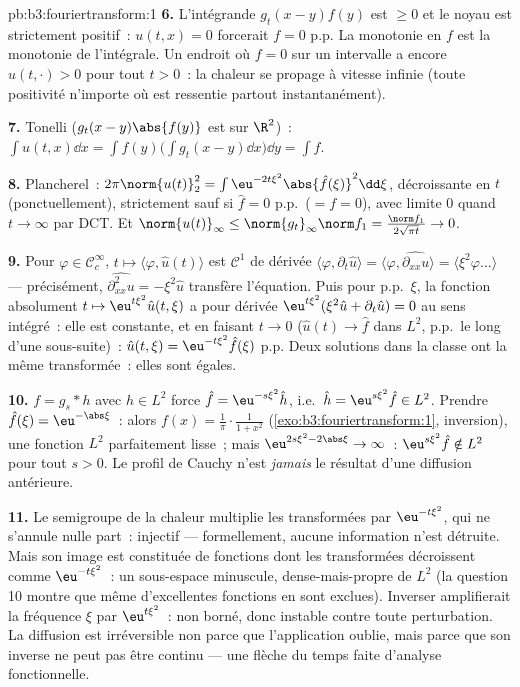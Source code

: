 \begin{solution}{pb:b3:fouriertransform:1}
\textbf{6.} L'intégrande $g_t(x-y)f(y)$ est $\geq 0$ et le
noyau est strictement positif~: $u(t,x) = 0$ forcerait $f =
0$ p.p. La monotonie en $f$ est la monotonie de l'intégrale.
Un endroit où $f = 0$ sur un intervalle a encore $u(t, \cdot)
> 0$ pour tout $t > 0$~: la chaleur se propage à vitesse
infinie (toute positivité n'importe où est ressentie partout
instantanément).

\textbf{7.} Tonelli ($g_t(x-y)\abs{f(y)}$ est  sur
$\R^2$)~: $\int u(t,x)\dd x = \int f(y)\bigl(\int g_t(x -
y)\dd x\bigr)\dd y = \int f$.

\textbf{8.} Plancherel~: $2\pi\norm{u(t)}_2^2 =
\int\eu^{-2t\xi^2}\abs{\hat f(\xi)}^2\dd\xi$, décroissante en
$t$ (ponctuellement), strictement sauf si $\hat f = 0$ p.p.\
($= f = 0$), avec limite $0$ quand $t\to\infty$ par DCT. Et
$\norm{u(t)}_\infty \leq \norm{g_t}_\infty\norm f_1 =
\frac{\norm f_1}{2\sqrt{\pi t}} \to 0$.

\textbf{9.} Pour $\varphi \in \mathcal C_c^\infty$, $t \mapsto
\langle\varphi, \hat u(t)\rangle$ est $\mathcal C^1$ de
dérivée $\langle\varphi, \partial_t\hat u\rangle =
\langle\varphi, \widehat{\partial_{xx}u}\rangle =
\langle\xi^2\varphi\dots\rangle$ --- précisément,
$\widehat{\partial^2_{xx}u} = -\xi^2\hat u$ transfère
l'équation. Puis pour p.p.\ $\xi$, la fonction absolument
 $t \mapsto \eu^{t\xi^2}\hat u(t,\xi)$ a pour
dérivée $\eu^{t\xi^2}(\xi^2\hat u + \partial_t\hat u) = 0$
au sens intégré~: elle est constante, et en faisant $t \to 0$
($\hat u(t) \to \hat f$ dans $L^2$, p.p.\ le long d'une
sous-suite)~: $\hat u(t, \xi) = \eu^{-t\xi^2}\hat f(\xi)$
p.p. Deux solutions dans la classe ont la même transformée~:
elles sont égales.

\textbf{10.} $f = g_s * h$ avec $h \in L^2$ force $\hat f =
\eu^{-s\xi^2}\hat h$, i.e.\ $\hat h = \eu^{s\xi^2}\hat f \in
L^2$. Prendre $\hat f(\xi) = \eu^{-\abs\xi}$~: alors $f(x) =
\frac1\pi\cdot\frac1{1 + x^2}$
(\cref{exo:b3:fouriertransform:1}, inversion), une fonction
$L^2$ parfaitement lisse~; mais $\eu^{2s\xi^2 - 2\abs\xi}
\to \infty$~: $\eu^{s\xi^2}\hat f \notin L^2$ pour tout $s >
0$. Le profil de Cauchy n'est \emph{jamais} le résultat d'une
diffusion antérieure.

\textbf{11.} Le semigroupe de la chaleur multiplie les
transformées par $\eu^{-t\xi^2}$, qui ne s'annule nulle
part~: injectif --- formellement, aucune information n'est
détruite. Mais son image est constituée de fonctions dont les
transformées décroissent comme $\eu^{-t\xi^2}$~: un
sous-espace minuscule, dense-mais-propre de $L^2$ (la
question 10 montre que même d'excellentes fonctions en sont
exclues). Inverser amplifierait la fréquence $\xi$ par
$\eu^{t\xi^2}$~: non borné, donc instable contre toute
perturbation. La diffusion est irréversible non parce que
l'application oublie, mais parce que son inverse ne peut pas
être continu --- une flèche du temps faite d'analyse
fonctionnelle.


\end{solution}
